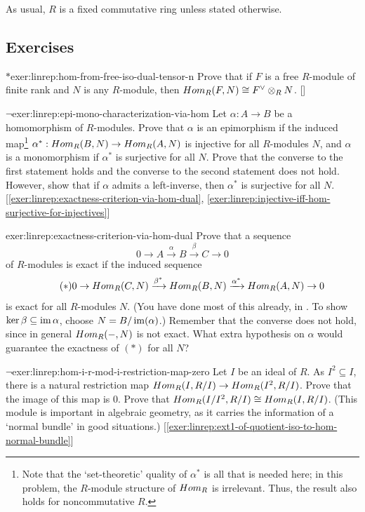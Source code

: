 As usual, $R$ is a fixed commutative ring unless stated otherwise.

\subsection*{Exercises}
\begin{exer}{$*$}{exer:linrep:hom-from-free-iso-dual-tensor-n}
  Prove that if $F$ is a free $R$-module of finite rank and $N$ is any
  $R$-module, then $Hom_R(F, N) \cong F^\vee \otimes_R N$.
  []
\end{exer}

\begin{exer}{$\lnot$}{exer:linrep:epi-mono-characterization-via-hom}
  Let $\alpha : A \to B$ be a homomorphism of $R$-modules. Prove that
  $\alpha$ is an epimorphism if the induced map\footnote{Note that the
    `set-theoretic' quality of $\alpha^*$ is all that is needed here;
    in this problem, the $R$-module structure of $Hom_R$ is
    irrelevant. Thus, the result also holds for noncommutative $R$.}
  $\alpha^* : Hom_R(B, N) \to Hom_R(A, N)$ is injective for all
  $R$-modules $N$, and $\alpha$ is a monomorphism if $\alpha^*$ is
  surjective for all $N$. Prove that the converse to the first
  statement holds and the converse to the second statement does not
  hold. However, show that if $\alpha$ admits a left-inverse, then
  $\alpha^*$ is surjective for all
  $N$. [\ref{exer:linrep:exactness-criterion-via-hom-dual},
  \ref{exer:linrep:injective-iff-hom-surjective-for-injectives}]
\end{exer}

\begin{exer}{}{exer:linrep:exactness-criterion-via-hom-dual}
  Prove that a sequence
  \[
    0 \to A \xrightarrow{\alpha} B \xrightarrow{\beta} C \to 0
  \]
  of $R$-modules is exact if the induced sequence
  \[
    \tag{$*$} 0 \to Hom_R(C,N) \xrightarrow{\beta^*} Hom_R(B,N)
    \xrightarrow{\alpha^*} Hom_R(A,N) \to 0
  \]
  is exact for all $R$-modules $N$. (You have done most of this
  already, in . To
  show $\ker\beta \subseteq \operatorname{im}\alpha$, choose
  $N = B/\operatorname{im}(\alpha)$.) Remember that the converse does not hold,
  since in general $Hom_R(-,N)$ is not exact.  What extra hypothesis
  on $\alpha$ would guarantee the exactness of $(*)$ for all $N$?
\end{exer}

\begin{exer}{$\lnot$}{exer:linrep:hom-i-r-mod-i-restriction-map-zero}
  Let $I$ be an ideal of $R$. As $I^2 \subseteq I$, there is a natural
  restriction map $Hom_R(I, R/I) \to Hom_R(I^2, R/I)$. Prove that
  the image of this map is $0$.  Prove that
  $Hom_R(I/I^2, R/I) \cong Hom_R(I, R/I)$. (This module is important
  in algebraic geometry, as it carries the information of a `normal
  bundle' in good situations.)
  [\ref{exer:linrep:ext1-of-quotient-iso-to-hom-normal-bundle}]
\end{exer}

